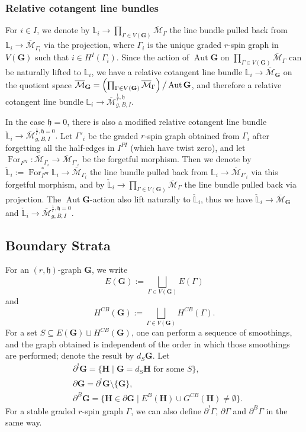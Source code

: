 \documentclass[11pt,a4paper]{article}
\theoremstyle{definition}
\theoremstyle{remark}
\numberwithin{equation}{section}
\def\Mbar{{\overline{\mathcal M}}}
\def\h{{\mathfrak h}}
\begin{document}
\subsubsection*{Relative cotangent line bundles}
For $i\in I$, we denote by $\mathbb L_i\to \prod_{\Gamma\in V(\mathbf{G})} \Mbar_\Gamma$ the line bundle pulled back from $\mathbb L_i \to \Mbar_{\Gamma_i}$ via the projection, where $\Gamma_i$ is the unique graded $r$-spin graph in $V(\mathbf{G})$ such that $i\in H^I(\Gamma_i)$. Since the action of $\operatorname{Aut}\mathbf{G}$ on $\prod_{\Gamma\in V(\mathbf{G})} \Mbar_\Gamma$ can be naturally lifted to $\mathbb L_i$, we have a relative cotangent line bundle 
$
\mathbb L_i \to \Mbar_\mathbf{G}
$
on the quotient space $\Mbar_\mathbf{G}=\left(\prod_{\Gamma\in V(\mathbf{G})} \Mbar_\Gamma\right)\big\slash \operatorname{Aut} \mathbf{G}$, and therefore a relative cotangent line bundle 
$\mathbb L_i \to \Mbar^{\frac{1}{r},\h}_{g,B,I}.$

In the case $\h=0$, there is also a modified relative cotangent line bundle 
$\check{\mathbb L}_i \to \Mbar^{\frac{1}{r},\h=0}_{g,B,I}.$
Let $\Gamma'_i$ be the graded $r$-spin graph obtained from $\Gamma_i$ after forgetting all the half-edges in $I^{PI}$ (which have twist zero), and let $\operatorname{For}_{I^{PI}}\colon \Mbar_{\Gamma_i}\to \Mbar_{\Gamma'_i}$ be the forgetful morphism. Then we denote by 
$\check{\mathbb L}_i:=\operatorname{For}^*_{I^{PI}}\mathbb L_i\to \Mbar_{\Gamma_i}$ the line bundle pulled back from $\mathbb L_i\to  \Mbar_{\Gamma'_i}$ via this forgetful morphism, and by
$\check{\mathbb L}_i\to \prod_{\Gamma\in V(\mathbf{G})} \Mbar_\Gamma$ the line bundle pulled back via projection. The $\operatorname{Aut} \mathbf{G}$-action also lift naturally to $\check{\mathbb L}_i$, thus we have $\check{\mathbb L}_i \to \Mbar_\mathbf{G}$ and $\check{\mathbb L}_i \to \Mbar^{\frac{1}{r},\h=0}_{g,B,I}.$

 

  

\subsection{Boundary Strata}
For  an $(r,\h)$-graph $\mathbf{G}$, we write
$$
E(\mathbf{G}):=\bigsqcup_{\Gamma\in V(\mathbf{G})} E(\Gamma)
$$
and 
$$
H^{CB}(\mathbf{G}):= \bigsqcup_{\Gamma\in V(\mathbf{G})}  H^{CB}(\Gamma).
$$
For a set 
$S\subseteq E(\mathbf{G})\sqcup H^{CB}(\mathbf{G})$, 
one can perform a sequence of smoothings, and the graph obtained is independent of the order in which those smoothings are performed;  denote the result by $d_S \mathbf{G}$.  Let
\begin{align*}
&\partial^!\mathbf{G} = \{\mathbf{H} \; | \; \mathbf{G} = d_S\mathbf{H} \text{ for some } S\},\\
&\partial \mathbf{G} = {\partial}^!\mathbf{G} \setminus \{\mathbf{G}\},\\
&\partial^B \mathbf{G} = \{\mathbf{H} \in {\partial} \mathbf{G} \; | \; E^B(\mathbf{H}) \cup G^{CB}(\mathbf{H}) \neq \emptyset\}.
\end{align*}
For a stable graded $r$-spin graph $\Gamma$, we can also define $\partial^!{\Gamma}$, $\partial \Gamma$ and $\partial^B{\Gamma}$ in the same way.
 
\end{document}
